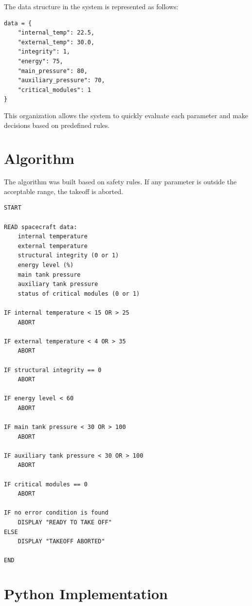 \documentclass[12pt]{article}
\begin{document}
The data structure in the system is represented as follows:

\begin{lstlisting}[style=pythonstyle]
data = {
    "internal_temp": 22.5,
    "external_temp": 30.0,
    "integrity": 1,
    "energy": 75,
    "main_pressure": 80,
    "auxiliary_pressure": 70,
    "critical_modules": 1
}
\end{lstlisting}

This organization allows the system to quickly evaluate each parameter and make decisions based on predefined rules.

\section{Algorithm}

The algorithm was built based on safety rules. If any parameter is outside the acceptable range, the takeoff is aborted.

\begin{verbatim}
START

READ spacecraft data:
    internal temperature
    external temperature
    structural integrity (0 or 1)
    energy level (%)
    main tank pressure
    auxiliary tank pressure
    status of critical modules (0 or 1)

IF internal temperature < 15 OR > 25
    ABORT

IF external temperature < 4 OR > 35
    ABORT

IF structural integrity == 0
    ABORT

IF energy level < 60
    ABORT

IF main tank pressure < 30 OR > 100
    ABORT

IF auxiliary tank pressure < 30 OR > 100
    ABORT

IF critical modules == 0
    ABORT

IF no error condition is found
    DISPLAY "READY TO TAKE OFF"
ELSE
    DISPLAY "TAKEOFF ABORTED"

END
\end{verbatim}

\newpage

\section{Python Implementation}
\end{document}

